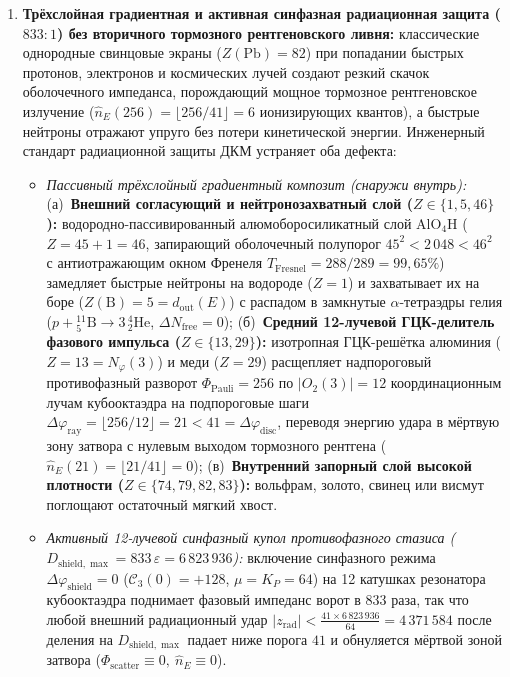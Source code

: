 \begin{enumerate}[label=\textbf{\arabic*.},leftmargin=*]
\begin{itemize}[noitemsep]
  \end{itemize}
\item \textbf{Трёхслойная градиентная и активная синфазная радиационная защита ($833 : 1$) без вторичного тормозного рентгеновского ливня:}
  классические однородные свинцовые экраны ($Z(\mathrm{Pb}) = 82$) при попадании быстрых протонов, электронов и космических лучей создают резкий скачок оболочечного импеданса, порождающий мощное тормозное рентгеновское излучение ($\hat{n}_E(256) = \lfloor 256 / 41 \rfloor = 6$ ионизирующих квантов), а быстрые нейтроны отражают упруго без потери кинетической энергии. Инженерный стандарт радиационной защиты ДКМ устраняет оба дефекта:
  \begin{itemize}[noitemsep]
  \item \emph{Пассивный трёхслойный градиентный композит (снаружи внутрь):}
    (а)~\textbf{Внешний согласующий и нейтронозахватный слой ($Z \in \{1, 5, 46\}$):} водородно-пассивированный алюмоборосиликатный слой $\mathrm{AlO_4H}$ ($Z = 45 + 1 = 46$, запирающий оболочечный полупорог $45^2 < 2\,048 < 46^2$ с антиотражающим окном Френеля $T_{\mathrm{Fresnel}} = 288/289 = 99{,}65\%$) замедляет быстрые нейтроны на водороде ($Z=1$) и захватывает их на боре ($Z(\mathrm{B}) = 5 = d_{\mathrm{out}}(E)$) с распадом в замкнутые $\alpha$-тетраэдры гелия ($p + {}^{11}_5\mathrm{B} \to 3\,{}^4_2\mathrm{He}$, $\Delta N_{\mathrm{free}} = 0$);
    (б)~\textbf{Средний 12-лучевой ГЦК-делитель фазового импульса ($Z \in \{13, 29\}$):} изотропная ГЦК-решётка алюминия ($Z=13=N_\varphi(3)$) и меди ($Z=29$) расщепляет надпороговый противофазный разворот $\Phi_{\mathrm{Pauli}} = 256$ по $|O_2(3)| = 12$ координационным лучам кубооктаэдра на подпороговые шаги $\Delta\varphi_{\mathrm{ray}} = \lfloor 256 / 12 \rfloor = 21 < 41 = \Delta\varphi_{\mathrm{disc}}$, переводя энергию удара в мёртвую зону затвора с нулевым выходом тормозного рентгена ($\hat{n}_E(21) = \lfloor 21 / 41 \rfloor = 0$);
    (в)~\textbf{Внутренний запорный слой высокой плотности ($Z \in \{74, 79, 82, 83\}$):} вольфрам, золото, свинец или висмут поглощают остаточный мягкий хвост.
  \item \emph{Активный 12-лучевой синфазный купол противофазного стазиса ($D_{\mathrm{shield,\max}} = 833\,\varepsilon = 6\,823\,936$):}
    включение синфазного режима $\Delta\varphi_{\mathrm{shield}} = 0$ ($\mathcal{C}_3(0) = +128$, $\mu = K_P = 64$) на 12 катушках резонатора кубооктаэдра поднимает фазовый импеданс ворот в $833$ раза, так что любой внешний радиационный удар $|z_{\mathrm{rad}}| < \frac{41 \times 6\,823\,936}{64} = 4\,371\,584$ после деления на $D_{\mathrm{shield,\max}}$ падает ниже порога $41$ и обнуляется мёртвой зоной затвора ($\Phi_{\mathrm{scatter}} \equiv 0,\ \hat{n}_E \equiv 0$).

\end{itemize}
\end{enumerate}
